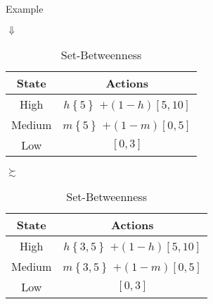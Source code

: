 \documentclass[usenames,dvipsnames,aspectratio=169,11pt, envcountsect, handout]{beamer}
\begin{document}
\begin{frame}{Example}
	\begin{center}
		\( \Downarrow \)
	\end{center}

	\begin{table}[H]
		\centering
		\begin{minipage}{0.45\textwidth}
			\centering
			\begin{tabular}{c | c}
				State                          & Actions                                                                                       \\
				\hline
				{\color{bleudefrance} High}    & {\color{bleudefrance}\( h \left\{ 5 \right\} \) } \(+ \left(1-h \right) \left[5,10 \right] \) \\
				{\color{bleudefrance} Medium } & {\color{bleudefrance}\( m \left\{ 5 \right\} \) } \(+ \left(1-m \right) \left[0,5 \right] \)  \\
				Low                            & \( \left[0,3 \right] \)                                                                       \\
			\end{tabular}
			\vspace{0.5cm} %
		\end{minipage}\hspace{0.25cm} %
		\( \succsim \) %
		\hspace{0.25cm}
		\begin{minipage}{0.45\textwidth}
			\centering
			\begin{tabular}{c | c}
				State                          & Actions                                                                                         \\
				\hline
				{\color{bleudefrance} High}    & {\color{bleudefrance}\( h \left\{ 3,5 \right\} \) } \(+ \left(1-h \right) \left[5,10 \right] \) \\
				{\color{bleudefrance} Medium } & {\color{bleudefrance}\( m \left\{ 3,5 \right\} \) } \(+ \left(1-m \right) \left[0,5 \right] \)  \\
				Low                            & \( \left[0,3 \right] \)                                                                         \\
			\end{tabular}
			\vspace{0.5cm} %
		\end{minipage}
		\caption{Set-Betweenness} %
		\label{tab:sbetweenness}
	\end{table}
\end{frame}
\end{document}
